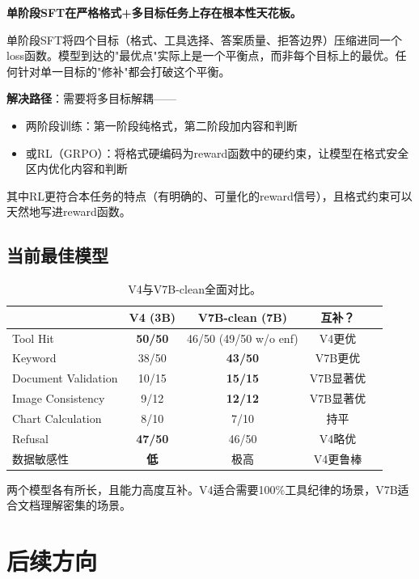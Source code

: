 \documentclass[fontset=none,11pt,a4paper]{ctexart}
\begin{document}
\begin{center}
\textbf{单阶段SFT在严格格式+多目标任务上存在根本性天花板。}
\end{center}

单阶段SFT将四个目标（格式、工具选择、答案质量、拒答边界）压缩进同一个loss函数。模型到达的"最优点"实际上是一个平衡点，而非每个目标上的最优。任何针对单一目标的"修补"都会打破这个平衡。

\textbf{解决路径}：需要将多目标解耦------
\begin{itemize}[nosep]
    \item 两阶段训练：第一阶段纯格式，第二阶段加内容和判断
    \item 或RL（GRPO）：将格式硬编码为reward函数中的硬约束，让模型在格式安全区内优化内容和判断
\end{itemize}
其中RL更符合本任务的特点（有明确的、可量化的reward信号），且格式约束可以天然地写进reward函数。

\subsection{当前最佳模型}

\begin{table}[htbp]
\centering
\begin{tabular}{lcccl}
\toprule
 & V4 (3B) & V7B-clean (7B) & 互补？ \\
\midrule
Tool Hit & \textbf{50/50} & 46/50 (49/50 w/o enf) & V4更优 \\
Keyword & 38/50 & \textbf{43/50} & V7B更优 \\
Document Validation & 10/15 & \textbf{15/15} & V7B显著优 \\
Image Consistency & 9/12 & \textbf{12/12} & V7B显著优 \\
Chart Calculation & 8/10 & 7/10 & 持平 \\
Refusal & \textbf{47/50} & 46/50 & V4略优 \\
数据敏感性 & \textbf{低} & 极高 & V4更鲁棒 \\
\bottomrule
\end{tabular}
\caption{V4与V7B-clean全面对比。}
\label{tab:comparison}
\end{table}

两个模型各有所长，且能力高度互补。V4适合需要100\%工具纪律的场景，V7B适合文档理解密集的场景。

\section{后续方向}
\end{document}
